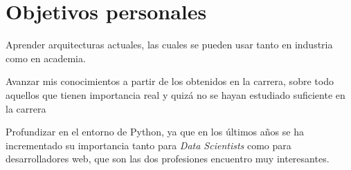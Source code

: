 \section{Objetivos personales}
\begin{list}{-}{}
\item Aprender arquitecturas actuales, las cuales se pueden usar tanto en industria como en academia.
\item Avanzar mis conocimientos a partir de los obtenidos en la carrera, sobre todo aquellos que tienen importancia real y quizá no se hayan estudiado suficiente en la carrera
\item Profundizar en el entorno de Python, ya que en los últimos años se ha incrementado su importancia tanto para \textit{Data Scientists} como para desarrolladores web, que son las dos profesiones encuentro muy interesantes.
\end{list}

